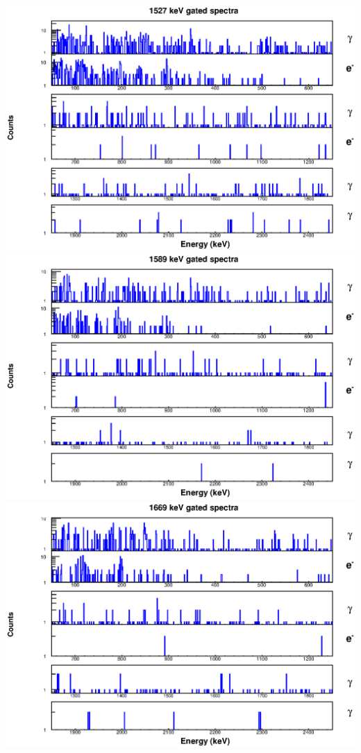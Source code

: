 \begin{landscape}
\includegraphics[scale=1.1]{154Gd_Appendix/1527_combined.eps}
\includegraphics[scale=1.1]{154Gd_Appendix/1589_combined.eps}
\includegraphics[scale=1.1]{154Gd_Appendix/1669_combined.eps}

\end{landscape}
